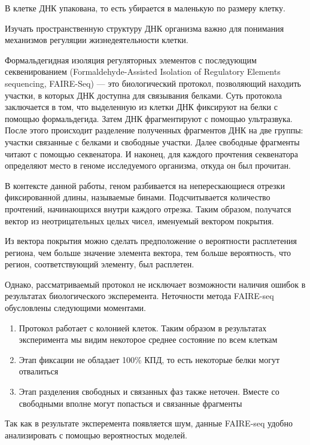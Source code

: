 \documentclass{matmex-diploma-custom}
\begin{document}
В клетке ДНК упакована, то есть убирается в маленькую по размеру клетку.

Изучать пространственную структуру ДНК организма важно для понимания механизмов регуляции жизнедеятельности клетки.

Формальдегидная изоляция регуляторных элементов с последующим секвенированием (Formaldehyde-Assisted Isolation of Regulatory Elements sequencing, FAIRE-Seq) --- это биологический протокол, позволяющий находить участки, в которых ДНК доступна для связывания белками. Суть протокола заключается в том, что выделенную из клетки ДНК фиксируют на белки с помощью формальдегида. Затем ДНК фрагментируют с помощью ультразвука. После этого происходит разделение полученных фрагментов ДНК на две группы: участки связанные с белками и свободные участки. Далее свободные фрагменты читают с помощью секвенатора. И наконец, для каждого прочтения секвенатора определяют место в геноме исследуемого организма, откуда он был прочитан.

В контексте данной работы, геном разбивается на неперескающиеся отрезки фиксированной длины, называемые бинами. Подсчитывается количество прочтений, начинающихся внутри каждого отрезка. Таким образом, получатся вектор из неотрицательных целых чисел, именуемый вектором покрытия.

Из вектора покрытия можно сделать предположение о вероятности расплетения региона, чем больше значение элемента вектора, тем больше вероятность, что регион, соответствующий элементу, был расплетен.

Однако, рассматриваемый протокол не исключает возможности наличия ошибок в результатах биологического эксперемента. Неточности метода FAIRE-seq обусловлены следующими моментами.
\begin{enumerate}
\item
Протокол работает с колонией клеток. Таким образом в результатах эксперимента мы видим некоторое среднее состояние по всем клеткам
\item
Этап фиксации не обладает 100\% КПД, то есть некоторые белки могут отвалиться 
\item
Этап разделения свободных и связанных фаз также неточен. Вместе со свободными вполне могут попасться и связанные фрагменты
\end{enumerate}

Так как в результате эксперемента появляется шум, данные FAIRE-seq удобно анализировать с помощью вероятностых моделей.
\end{document}
